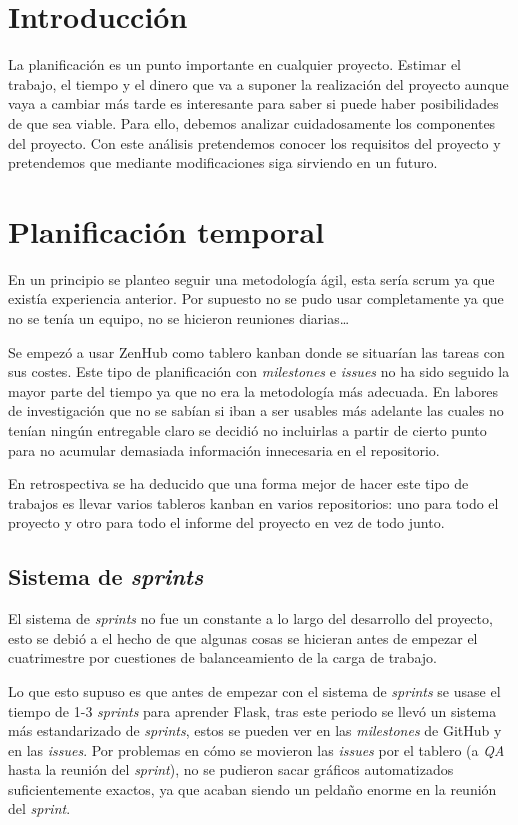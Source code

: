 
\section{Introducción}

La planificación es un punto importante en cualquier proyecto. Estimar el trabajo, el tiempo y el dinero que va a suponer la realización del proyecto aunque vaya a cambiar más tarde es interesante para saber si puede haber posibilidades de que sea viable. Para ello, debemos analizar cuidadosamente los componentes del proyecto. Con este análisis pretendemos conocer los requisitos del proyecto y pretendemos que mediante modificaciones siga sirviendo en un futuro.

\section{Planificación temporal}
En un principio se planteo seguir una metodología ágil, esta sería scrum ya que existía experiencia anterior. Por supuesto no se pudo usar completamente ya que no se tenía un equipo, no se hicieron reuniones diarias\ldots

Se empezó a usar ZenHub como tablero kanban donde se situarían las tareas con sus costes. Este tipo de planificación con \emph{milestones} e \emph{issues} no ha sido seguido la mayor parte del tiempo ya que no era la metodología más adecuada. En labores de investigación que no se sabían si iban a ser usables más adelante las cuales no tenían ningún entregable claro se decidió no incluirlas a partir de cierto punto para no acumular demasiada información innecesaria en el repositorio.

En retrospectiva se ha deducido que una forma mejor de hacer este tipo de trabajos es llevar varios tableros kanban en varios repositorios: uno para todo el proyecto y otro para todo el informe del proyecto en vez de todo junto.

\subsection{Sistema de \emph{sprints}}

El sistema de \emph{sprints} no fue un constante a lo largo del desarrollo del proyecto, esto se debió a el hecho de que algunas cosas se hicieran antes de empezar el cuatrimestre por cuestiones de balanceamiento de la carga de trabajo.

Lo que esto supuso es que antes de empezar con el sistema de \emph{sprints} se usase el tiempo de 1-3 \emph{sprints} para aprender Flask, tras este periodo se llevó un sistema más estandarizado de \emph{sprints}, estos se pueden ver en las \emph{milestones} de GitHub y en las \emph{issues}. Por problemas en cómo se movieron las \emph{issues} por el tablero (a \emph{QA} hasta la reunión del \emph{sprint}), no se pudieron sacar gráficos automatizados suficientemente exactos, ya que acaban siendo un peldaño enorme en la reunión del \emph{sprint}.

